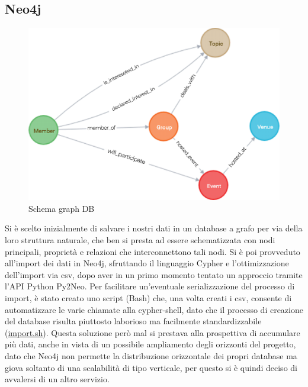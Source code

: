 \documentclass[fleqn,10pt]{SelfArx} %
\begin{document}
{\subsection{Neo4j}%
\begin{figure}
\centering
\includegraphics[scale=0.57]{graph.png}
\caption{\label{graph_neo4j} Schema graph DB}
\end{figure}
Si è scelto inizialmente di salvare i nostri dati in un database a grafo per via della loro struttura naturale, che ben si presta ad essere schematizzata con nodi principali, proprietà e relazioni che interconnettono tali nodi. 
Si è poi provveduto all'import dei dati in Neo4j, sfruttando il linguaggio Cypher e l'ottimizzazione dell'import via csv, dopo aver in un primo momento tentato un approccio tramite l'API Python Py2Neo. 
Per facilitare un'eventuale serializzazione del processo di import, è stato creato uno script (Bash) che, una volta creati i csv, consente di automatizzare le varie chiamate alla cypher-shell, dato che il processo di creazione del database risulta piuttosto laborioso ma facilmente standardizzabile (\href{https://github.com/DBertazioli/NeoMeetup/blob/master/Scripts/import_cypher.sh}{import.sh}).
Questa soluzione però mal si prestava alla prospettiva di accumulare più dati, anche in vista di un possibile ampliamento degli orizzonti del progetto, dato che Neo4j non permette la distribuzione orizzontale dei propri database ma giova soltanto di una scalabilità di tipo verticale, per questo si è quindi deciso di avvalersi di un altro servizio.
}
\end{document}
